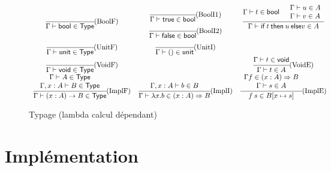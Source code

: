 \documentclass{article}
\theoremstyle{definition}
\theoremstyle{remark}
\begin{document}
\begin{figure}
  \[\begin{array}{ccc}
  \cfrac{}
        {\Gamma\vdash \mathsf{bool} \in \mathsf{Type}}\mbox{(BoolF)}
  & 
  \begin{array}{c}
  \cfrac{}
        {\Gamma \vdash \mathsf{true} \in \mathsf{bool}}\mbox{(BoolI1)}
  \\
  \cfrac{}
        {\Gamma \vdash \mathsf{false} \in \mathsf{bool}}\mbox{(BoolI2)}
  \end{array}
  &
  \cfrac{\Gamma \vdash t \in \mathsf{bool} \quad 
         \begin{array}{l}
          \Gamma \vdash u \in A \\
          \Gamma \vdash v \in A 
         \end{array}}
        {\Gamma \vdash \mathsf{if}\: t\: \mathsf{then}\: u\: \mathsf{else} v \in A}
  \\
  \cfrac{}
        {\Gamma\vdash \mathsf{unit} \in \mathsf{Type}}\mbox{(UnitF)}
  & 
  \cfrac{}
        {\Gamma\vdash () \in \mathsf{unit}}\mbox{(UnitI)}
  \\
  \cfrac{}
        {\Gamma\vdash \mathsf{void} \in \mathsf{Type}}\mbox{(VoidF)}
  &
  &
  \cfrac{\Gamma\vdash t \in \mathsf{void}}
        {\Gamma\vdash t \in A}\mbox{(VoidE)}
  \\
  \cfrac{\begin{array}{c}
          \Gamma\vdash A \in \mathsf{Type} \\
          \Gamma, x : A \vdash B \in \mathsf{Type}
         \end{array}}
        {\Gamma \vdash (x:A) \rightarrow B \in \mathsf{Type}} 
        \mbox{(ImplF)}
  &
  \cfrac{\Gamma, x:A \vdash b\in B}
        {\Gamma \vdash \lambda x. b \in (x:A) \Rightarrow B}
        \mbox{(ImplI)}
  & 
  \cfrac{\begin{array}{c}
          \Gamma f \in (x:A)\Rightarrow B \\
          \Gamma \vdash s \in A
         \end{array}}
        {f\: s \in B[x \mapsto s]}
        \mbox{(ImplE)}
  \end{array}\]
  \caption{Typage (lambda calcul dépendant)}
  \label{fig:typage-dependant}
\end{figure}


\section{Implémentation}
\end{document}
